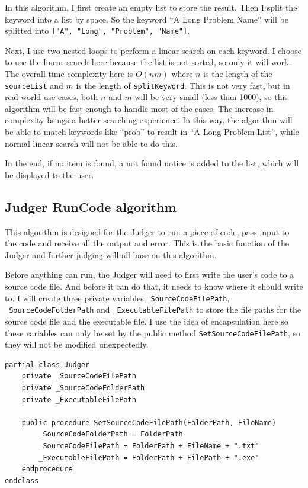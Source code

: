 \documentclass[a4paper]{report}
\newcommand{\code}{\texttt}
\begin{document}
In this algorithm, I first create an empty list to store the result. Then I split the keyword into a list by space. So the keyword ``A Long Problem Name'' will be splitted into \code{["A", "Long", "Problem", "Name"]}.

Next, I use two nested loops to perform a linear search on each keyword. I choose to use the linear search here because the list is not sorted, so only it will work. The overall time complexity here is $O(nm)$ where $n$ is the length of the \code{sourceList} and $m$ is the length of \code{splitKeyword}. This is not very fast, but in real-world use cases, both $n$ and $m$ will be very small (less than 1000), so this algorithm will be fast enough to handle most of the cases. The increase in complexity brings a better searching experience. In this way, the algorithm will be able to match keywords like ``prob'' to result in ``A Long Problem List'', while normal linear search will not be able to do this.

In the end, if no item is found, a not found notice is added to the list, which will be displayed to the user.

\subsection{Judger RunCode algorithm}

This algorithm is designed for the Judger to run a piece of code, pass input to the code and receive all the output and error. This is the basic function of the Judger and further judging will all base on this algorithm.

Before anything can run, the Judger will need to first write the user's code to a source code file. And before it can do that, it needs to know where it should write to. I will create three private variables \code{_SourceCodeFilePath}, \code{_SourceCodeFolderPath} and \code{_ExecutableFilePath} to store the file paths for the source code file and the executable file. I use the idea of encapsulation here so these variables can only be set by the public method \code{SetSourceCodeFilePath}, so they will not be modified unexpectedly.

\begin{verbatim}
partial class Judger
    private _SourceCodeFilePath
    private _SourceCodeFolderPath
    private _ExecutableFilePath

    public procedure SetSourceCodeFilePath(FolderPath, FileName)
        _SourceCodeFolderPath = FolderPath
        _SourceCodeFilePath = FolderPath + FileName + ".txt"
        _ExecutableFilePath = FolderPath + FilePath + ".exe"
    endprocedure
endclass
\end{verbatim}
\end{document}
